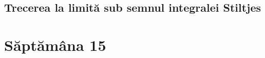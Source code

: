\documentclass[a4paper,12pt]{article}
\theoremstyle{change}
\begin{document}

\subsection{Trecerea la limită sub semnul integralei Stiltjes}

\section{Săptămâna 15}
\end{document}
